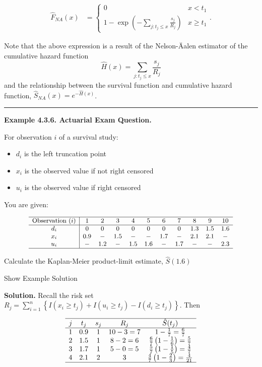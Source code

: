 \documentclass[]{book}
\providecommand{\tightlist}{%
  \setlength{\itemsep}{0pt}\setlength{\parskip}{0pt}}
\theoremstyle{definition}
\theoremstyle{definition}
\theoremstyle{definition}
\theoremstyle{remark}
\begin{document}
\[
\begin{aligned}
\hat{F}_{NA}(x) &=
\left\{
\begin{array}{ll}
0 & x<t_{1} \\
1- \exp \left(-\sum_{j:t_{j} \leq x}\frac{s_j}{R_j} \right) & x \geq t_{1} 
\end{array}
\right. .\end{aligned}
\]

Note that the above expression is a result of the Nelson-Äalen estimator
of the cumulative hazard function
\[\hat{H}(x)=\sum_{j:t_j\leq x}  \frac{s_j}{R_j} \] and the relationship
between the survival function and cumulative hazard function,
\(\hat{S}_{NA}(x)=e^{-\hat{H}(x)}\).

\begin{center}\rule{0.5\linewidth}{\linethickness}\end{center}

\textbf{Example 4.3.6. Actuarial Exam Question.}

For observation \(i\) of a survival study:

\begin{itemize}
\tightlist
\item
  \(d_i\) is the left truncation point
\item
  \(x_i\) is the observed value if not right censored
\item
  \(u_i\) is the observed value if right censored
\end{itemize}

You are given:

\[
{\small
\begin{array}{c|cccccccccc}
\hline
\text{Observation } (i) & 1 & 2 & 3 & 4 & 5 & 6 & 7 & 8 & 9 & 10\\ \hline
d_i & 0 & 0 & 0 & 0 & 0 & 0 & 0 & 1.3 & 1.5 & 1.6\\
x_i & 0.9 & - & 1.5 & - & - & 1.7 & - & 2.1 & 2.1 & - \\
u_i & - & 1.2 & - & 1.5 & 1.6 & - & 1.7 & - & - & 2.3 \\
\hline
\end{array}
}
\]

Calculate the Kaplan-Meier product-limit estimate, \(\hat{S}(1.6)\)

Show Example Solution

\hypertarget{toggleExampleSelect.3.6}{}
\textbf{Solution.} Recall the risk set
\(R_j = \sum_{i=1}^n \left\{ I(x_i \geq t_{j}) + I(u_i \geq t_{j}) - I(d_i \geq t_{j}) \right\}\).
Then

\[\begin{array}{ccccc}
\hline
j & t_j & s_j & R_j & \hat{S}(t_j) \\
\hline
1  & 0.9   & 1   & 10-3 = 7 & 1-\frac{1}{7} = \frac{6}{7} \\
2  & 1.5   & 1   & 8-2 = 6  & \frac{6}{7}\left( 1 - \frac{1}{6} \right) = \frac{5}{7}\\
3  & 1.7   & 1   & 5-0 = 5  & \frac{5}{7}\left( 1 - \frac{1}{5} \right) = \frac{4}{7}\\
4  & 2.1   & 2   & 3        & \frac{4}{7}\left( 1 - \frac{2}{3}\right) = \frac{4}{21}\\
\hline
\end{array}\]
\end{document}
